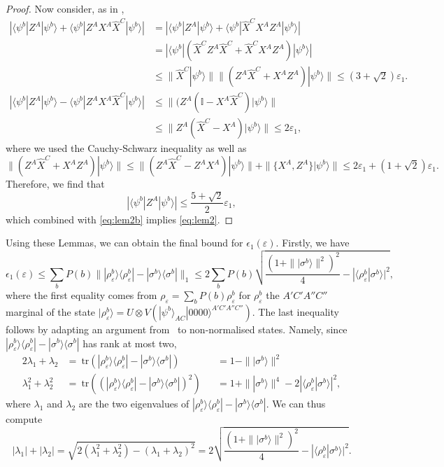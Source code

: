 \documentclass[onecolumn,prx,amsmath,amssymb,12pt]{revtex4-2}
\def\bra#1{\langle#1|} \def\ket#1{|#1\rangle}
\def\braket#1#2{\langle#1|#2\rangle}
\def\ketbra#1#2{\ket{#1}\!\bra{#2}}
\def\id{{\mathbb I}}
\def\tr{\mbox{tr}}
\def\norm#1{\| #1 \| }
\def\abs#1{|#1|}
\begin{document}
\begin{appendix}
\begin{proof}
\noindent  Now consider, as in \cite{singlet},
\begin{align*}
\abs{\bra{\psi^b}Z^A \ket{\psi^b}+\bra{\psi^b}Z^A X^A \hat{X}^C \ket{\psi^b}}
&=\abs{\bra{\psi^b}Z^A \ket{\psi^b}+\bra{\psi^b}\hat{X}^C X^A Z^A \ket{\psi^b}}\\
 &= \abs{\bra{\psi^b}(\hat{X}^C Z^A \hat{X}^C + \hat{X}^C X^A Z^A) \ket{\psi^b}} \\
&\leq \norm{\hat{X}^C \ket{\psi^b}} \norm{(Z^A \hat{X}^C +X^A Z^A) \ket{\psi^b}} \leq  (3+\sqrt{2})\varepsilon_1. \\
\abs{\bra{\psi^b}Z^A \ket{\psi^b}-\bra{\psi^b}Z^AX^A\hat{X}^C \ket{\psi^b}} &\leq \norm{(Z^A(\id - X^A \hat{X}^C)\ket{\psi^b}}\\
& \leq \norm{Z^A(\hat{X}^C-X^A) \ket{\psi^b}} \leq 2\varepsilon_1,
\end{align*}
where we used the Cauchy-Schwarz inequality as well as 
\[
\norm{(Z^A\hat{X}^C+ X^AZ^A) \ket{\psi^b}} \leq \norm{(Z^A\hat{X}^C-Z^AX^A)\ket{\psi^b}} + \norm{\{X^A,Z^A\}\ket{\psi^b}} \leq 2\varepsilon_1+(1+\sqrt{2})\varepsilon_1.
\]
Therefore, we find that \begin{equation}\label{ZA}
 \abs{\bra{\psi^b} Z^A \ket{\psi^b}}\leq \frac{5+\sqrt{2}}{2}\varepsilon_1,   
\end{equation} which combined with \eqref{eq:lem2b} implies \eqref{eq:lem2}.
\end{proof}

\bigskip

\noindent Using these Lemmas, we can obtain the final bound for $\epsilon_1(\varepsilon)$. Firstly, we have
\begin{equation}
\epsilon_1(\varepsilon) \leq \sum_b P(b) \norm{\ketbra{\rho_\varepsilon^b}{\rho_\varepsilon^b}-\ketbra{\sigma^b}{\sigma^b}}_1  \leq  2 \sum_b P(b) \sqrt{
\frac{(1+\norm{\ket{\sigma^b}}^2)^2}{4}-\abs{\braket{\rho_\varepsilon^b}{\sigma^b}}^2},
\end{equation}
where the first equality comes from $\rho_\varepsilon=\sum_b P(b) \rho_\varepsilon^b$ for $\rho_\varepsilon^b$ the $A'C'A''C''$ marginal of the state $\ket{\rho_\varepsilon^b}=U\otimes V(\ket{\psi^b}_{AC}\ket{0000}^{A'C'A''C''})$.
The last inequality follows by adapting an argument from~\cite{Watrous} to non-normalised states. Namely, since $\ketbra{\rho_\varepsilon^b}{\rho_\varepsilon^b}-\ketbra{\sigma^b}{\sigma^b}$ has rank at most two,
\begin{alignat}{2}
\lambda_1+\lambda_2&= \  \tr(\ketbra{\rho_\varepsilon^b}{\rho_\varepsilon^b}-\ketbra{\sigma^b}{\sigma^b}) &&= 1- \norm{\ket{\sigma^b}}^2 \nonumber\\
\lambda_1^2+\lambda_2^2 &= \ \tr((\ketbra{\rho_\varepsilon^b}{\rho_\varepsilon^b}-\ketbra{\sigma^b}{\sigma^b})^2) &&= 1+ \norm{\ket{\sigma^b}}^4-2\abs{\braket{\rho_\varepsilon^b}{\sigma^b}}^2, \nonumber
\end{alignat}
where $\lambda_1$ and $\lambda_2$ are the two eigenvalues of $\ketbra{\rho_\varepsilon^b}{\rho_\varepsilon^b}-\ketbra{\sigma^b}{\sigma^b}$. We can thus compute
$$\abs{\lambda_1}+\abs{\lambda_2}=\sqrt{2(\lambda_1^2+\lambda_2^2)-(\lambda_1+\lambda_2)^2}= 2\sqrt{
\frac{(1+\norm{\ket{\sigma^b}}^2)^2}{4}-\abs{\braket{\rho_\varepsilon^b}{\sigma^b}}^2}. $$



\end{appendix}
\end{document}
